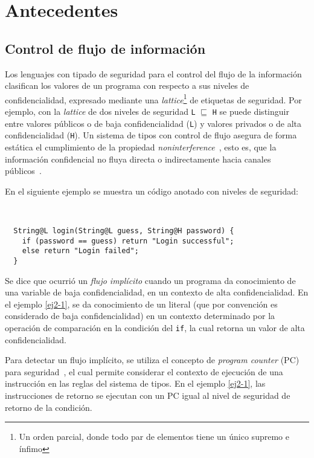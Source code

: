 \chapter{Antecedentes}

\section{Control de flujo de información}
Los lenguajes con tipado de seguridad para el control del flujo de la información clasifican los valores de un programa con respecto a sus niveles de confidencialidad, expresado mediante una \textit{lattice}\footnote{Un orden parcial, donde todo par de elementos tiene un único supremo e ínfimo} de etiquetas de seguridad. Por ejemplo, con la \textit{lattice} de dos niveles de seguridad \texttt{L} $\sqsubseteq$ \texttt{H} se puede distinguir entre valores públicos o de baja confidencialidad (\texttt{L}) y valores privados o de alta confidencialidad (\texttt{H}). Un sistema de tipos con control de flujo asegura de forma estática el cumplimiento de la propiedad \emph{noninterference}~\cite{noninterference}, esto es, que la información confidencial no fluya directa o indirectamente hacia canales públicos~\cite{volpanoAl:S96}.

En el siguiente ejemplo se muestra un código anotado con niveles de seguridad:

\begin{ej} \ \\
  \normalfont
  \label{ej2-1}
\begin{lstlisting}
  String@L login(String@L guess, String@H password) {
    if (password == guess) return "Login successful";
    else return "Login failed";
  }
\end{lstlisting}
\end{ej}

Se dice que ocurrió un \emph{flujo implícito} cuando un programa da conocimiento de una variable de baja confidencialidad, en un contexto de alta confidencialidad. En el ejemplo \ref{ej2-1}, se da conocimiento de un literal (que por convención es considerado de baja confidencialidad) en un contexto determinado por la operación de comparación en la condición del \texttt{if}, la cual retorna un valor de alta confidencialidad.

Para detectar un flujo implícito, se utiliza el concepto de \textit{program counter} (PC) para seguridad~\cite{pc}, el cual permite considerar el contexto de ejecución de una instrucción en las reglas del sistema de tipos. En el ejemplo \ref{ej2-1}, las instrucciones de retorno se ejecutan con un PC igual al nivel de seguridad de retorno de la condición.


